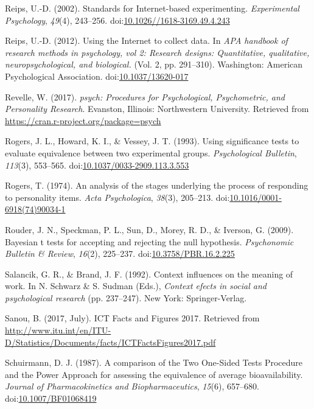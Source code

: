 \documentclass[english,man, mask]{apa6}
\theoremstyle{definition}
\theoremstyle{definition}
\theoremstyle{definition}
\theoremstyle{remark}
\begin{document}
\hypertarget{ref-Reips2002a}{}
Reips, U.-D. (2002). Standards for Internet-based experimenting.
\emph{Experimental Psychology}, \emph{49}(4), 243--256.
doi:\href{https://doi.org/10.1026//1618-3169.49.4.243}{10.1026//1618-3169.49.4.243}

\hypertarget{ref-Reips2012}{}
Reips, U.-D. (2012). Using the Internet to collect data. In \emph{APA
handbook of research methods in psychology, vol 2: Research designs:
Quantitative, qualitative, neuropsychological, and biological.} (Vol. 2,
pp. 291--310). Washington: American Psychological Association.
doi:\href{https://doi.org/10.1037/13620-017}{10.1037/13620-017}

\hypertarget{ref-Revelle2017}{}
Revelle, W. (2017). \emph{psych: Procedures for Psychological,
Psychometric, and Personality Research}. Evanston, Illinois:
Northwestern University. Retrieved from
\url{https://cran.r-project.org/package=psych}

\hypertarget{ref-Rogers1993}{}
Rogers, J. L., Howard, K. I., \& Vessey, J. T. (1993). Using
significance tests to evaluate equivalence between two experimental
groups. \emph{Psychological Bulletin}, \emph{113}(3), 553--565.
doi:\href{https://doi.org/10.1037/0033-2909.113.3.553}{10.1037/0033-2909.113.3.553}

\hypertarget{ref-Rogers1974}{}
Rogers, T. (1974). An analysis of the stages underlying the process of
responding to personality items. \emph{Acta Psychologica}, \emph{38}(3),
205--213.
doi:\href{https://doi.org/10.1016/0001-6918(74)90034-1}{10.1016/0001-6918(74)90034-1}

\hypertarget{ref-Rouder2009}{}
Rouder, J. N., Speckman, P. L., Sun, D., Morey, R. D., \& Iverson, G.
(2009). Bayesian t tests for accepting and rejecting the null
hypothesis. \emph{Psychonomic Bulletin \& Review}, \emph{16}(2),
225--237.
doi:\href{https://doi.org/10.3758/PBR.16.2.225}{10.3758/PBR.16.2.225}

\hypertarget{ref-Salancik1992}{}
Salancik, G. R., \& Brand, J. F. (1992). Context influences on the
meaning of work. In N. Schwarz \& S. Sudman (Eds.), \emph{Context efects
in social and psychological research} (pp. 237--247). New York:
Springer-Verlag.

\hypertarget{ref-Sanou2017}{}
Sanou, B. (2017, July). ICT Facts and Figures 2017. Retrieved from
\url{http://www.itu.int/en/ITU-D/Statistics/Documents/facts/ICTFactsFigures2017.pdf}

\hypertarget{ref-Schuirmann1987}{}
Schuirmann, D. J. (1987). A comparison of the Two One-Sided Tests
Procedure and the Power Approach for assessing the equivalence of
average bioavailability. \emph{Journal of Pharmacokinetics and
Biopharmaceutics}, \emph{15}(6), 657--680.
doi:\href{https://doi.org/10.1007/BF01068419}{10.1007/BF01068419}
\end{document}
